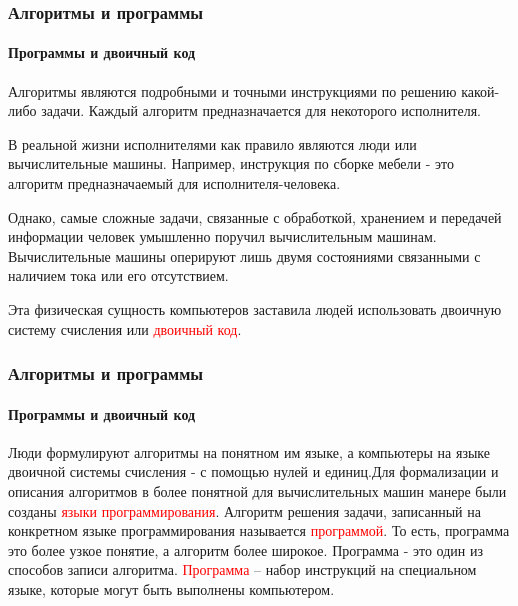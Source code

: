 \documentclass[aspectratio=169]{beamer}
\begin{document}
\begin{frame}
\frametitle{Алгоритмы и программы}
\framesubtitle{Программы и двоичный код}
\justifying

Алгоритмы являются подробными и точными инструкциями по решению какой-либо задачи. Каждый алгоритм предназначается для некоторого исполнителя.\newline

 В реальной жизни исполнителями как правило являются люди или вычислительные машины. Например, инструкция по сборке мебели - это алгоритм предназначаемый для исполнителя-человека.\newline

Однако, самые сложные задачи, связанные с обработкой, хранением и передачей информации  человек умышленно поручил вычислительным машинам.
Вычислительные машины оперируют лишь двумя состояниями связанными с наличием тока или его отсутствием.\newline

Эта физическая сущность компьютеров заставила людей использовать двоичную систему счисления или \textcolor{red}{двоичный код}.

\end{frame}

\begin{frame}
\frametitle{Алгоритмы и программы}
\framesubtitle{Программы и двоичный код}
\justifying

Люди формулируют алгоритмы на понятном им языке, а компьютеры на языке двоичной системы счисления - с помощью нулей и единиц.\newline\newline Для формализации и описания алгоритмов в более понятной для вычислительных машин манере были созданы \textcolor{red}{языки программирования}.\newline\newline 
Алгоритм решения задачи, записанный на конкретном языке программирования называется \textcolor{red}{программой}. То есть, программа это более узкое понятие, а алгоритм более широкое. Программа - это один из способов записи алгоритма. \newline\newline 
\textcolor{red}{Программа} – набор инструкций на специальном языке, которые могут быть выполнены компьютером.

\end{frame}
\end{document}
